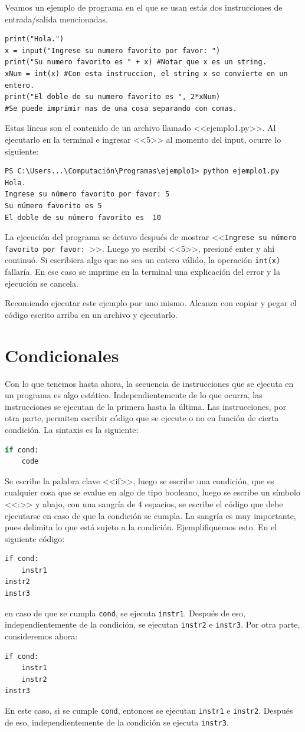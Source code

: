 \documentclass[a4paper, 12pt]{report}
\theoremstyle{definition}
\begin{document}
Veamos un ejemplo de programa en el que se usan estás dos instrucciones de entrada/salida mencionadas.
\begin{verbatim}
print("Hola.")
x = input("Ingrese su numero favorito por favor: ")
print("Su numero favorito es " + x) #Notar que x es un string.
xNum = int(x) #Con esta instruccion, el string x se convierte en un entero.
print("El doble de su numero favorito es ", 2*xNum)
#Se puede imprimir mas de una cosa separando con comas.
\end{verbatim}
Estas líneas son el contenido de un archivo llamado <<ejemplo1.py>>. Al ejecutarlo en la terminal e ingresar <<5>> al momento del input, ocurre lo siguiente:
\begin{verbatim}
PS C:\Users...\Computación\Programas\ejemplo1> python ejemplo1.py
Hola.
Ingrese su número favorito por favor: 5
Su número favorito es 5
El doble de su número favorito es  10
\end{verbatim}
La ejecución del programa se detuvo después de mostrar <<{\tt Ingrese su número favorito por favor: }>>. Luego yo escribí <<5>>, presioné enter y ahí continuó. Si escribiera algo que no sea un entero válido, la operación {\tt int(x)} fallaría. En ese caso se imprime en la terminal una explicación del error y la ejecución se cancela.

Recomiendo ejecutar este ejemplo por uno mismo. Alcanza con copiar y pegar el código escrito arriba en un archivo y ejecutarlo.

\section{Condicionales}

Con lo que tenemos hasta ahora, la secuencia de instrucciones que se ejecuta en un programa es algo estático. Independientemente de lo que ocurra, las instrucciones se ejecutan de la primera hasta la última. Las instrucciones, por otra parte, permiten escribir código que se ejecute o no en función de cierta condición. La sintaxis es la siguiente:
\begin{lstlisting}[language=python]
if cond:
    code
\end{lstlisting}
Se escribe la palabra clave <<if>>, luego se escribe una condición, que es cualquier cosa que se evalue en algo de tipo booleano, luego se escribe un símbolo <<:>> y abajo, con una sangría de 4 espacios, se escribe el código que debe ejecutarse en caso de que la condición se cumpla. La sangría es muy importante, pues delimita lo que está sujeto a la condición. Ejemplifiquemos esto. En el siguiente código:
\begin{verbatim}
if cond:
    instr1
instr2
instr3
\end{verbatim}
en caso de que se cumpla {\tt cond}, se ejecuta {\tt instr1}. Después de eso, independientemente de la condición, se ejecutan {\tt instr2} e {\tt instr3}. Por otra parte, consideremos ahora:
\begin{verbatim}
if cond:
    instr1
    instr2
instr3
\end{verbatim}
En este caso, si se cumple {\tt cond}, entonces se ejecutan {\tt instr1} e {\tt instr2}. Después de eso, independientemente de la condición se ejecuta {\tt instr3}.
\end{document}
